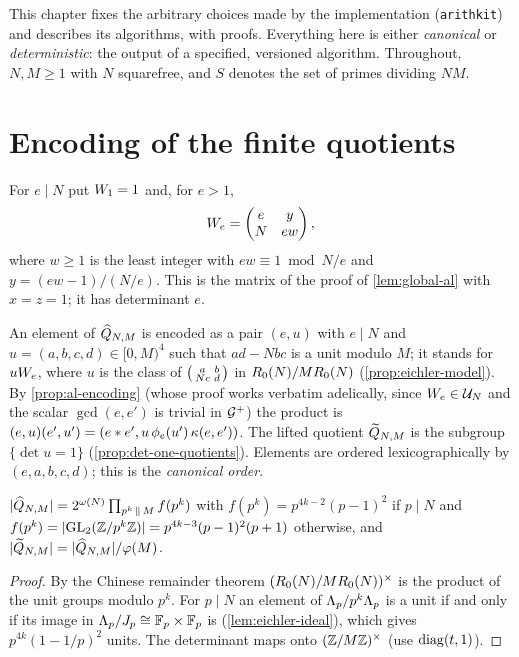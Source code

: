This chapter fixes the arbitrary choices made by the implementation
(\texttt{arithkit}) and describes its algorithms, with proofs. Everything
here is either \emph{canonical} or \emph{deterministic}: the output of a
specified, versioned algorithm. Throughout, $N, M \geq 1$ with $N$
squarefree, and $S$ denotes the set of primes dividing $NM$.

\section{Encoding of the finite quotients}\label{sec:algorithms}

\begin{convention}\label{conv:al-matrices}
For $e \mid N$ put $W_{1} = 1$ and, for $e > 1$,
\[
  W_{e} = \begin{pmatrix} e & y \\ N & ew \end{pmatrix},
\]
where $w \geq 1$ is the least integer with $ew \equiv 1 \bmod N/e$ and
$y = (ew - 1)/(N/e)$. This is the matrix of the proof of
\cref{lem:global-al} with $x = z = 1$; it has determinant $e$.
\end{convention}

\begin{convention}[Elements]\label{conv:elements}
An element of $\widehat{Q}_{N,M}$ is encoded as a pair $(e, u)$
with $e \mid N$ and $u = (a, b, c, d) \in [0, M)^4$ such that $ad - Nbc$ is
a unit modulo $M$; it stands for $uW_{e}$, where $u$ is the class of
$\left(\begin{smallmatrix} a & b \\ Nc & d \end{smallmatrix}\right)$ in $R_{0}(N)/MR_{0}(N)$
(\cref{prop:eichler-model}). By \cref{prop:al-encoding} (whose proof works
verbatim adelically, since $W_{e} \in \mathcal{U}_{N}$ and the scalar
$\gcd(e,e')$ is trivial in $\mathcal{G}^{+}$) the product is
$(e,u)(e',u') = (e\ast e', u\,\phi_{e}(u')\,\kappa(e,e'))$.
The lifted quotient $\widetilde{Q}_{N,M}$ is the subgroup
$\{\det u = 1\}$ (\cref{prop:det-one-quotients}). Elements are ordered
lexicographically by $(e, a, b, c, d)$; this is the \emph{canonical order}.
\end{convention}

\begin{lemma}[Orders]\label{lem:quotient-orders}
$|\widehat{Q}_{N,M}| = 2^{\omega(N)}\prod_{p^k \,\Vert\, M} f(p^k)$
with $f(p^k) = p^{4k-2}(p-1)^2$ if $p \mid N$ and
$f(p^k) = |\GL{2}{\ResidueRing{p^k}}| = p^{4k-3}(p-1)^2(p+1)$ otherwise, and
$|\widetilde{Q}_{N,M}| = |\widehat{Q}_{N,M}|/\varphi(M)$.
\end{lemma}

\begin{proof}
By the Chinese remainder theorem $(R_{0}(N)/MR_{0}(N))^{\times}$ is
the product of the unit groups modulo $p^k$. For $p \mid N$ an element of
$\Lambda_{p}/p^k\Lambda_{p}$ is a unit if and only if its image in
$\Lambda_{p}/J_{p} \cong \mathbb{F}_{p}\times\mathbb{F}_{p}$ is
(\cref{lem:eichler-ideal}), which gives $p^{4k}(1 - 1/p)^2$ units. The
determinant maps onto $(\mathbb{Z}/M\mathbb{Z})^{\times}$ (use $\mathrm{diag}(t,1)$).
\end{proof}


